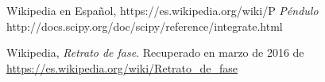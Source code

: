 \documentclass[12pt]{article}
\begin{document}
\pagebreak

\begin{thebibliography}{6}
	
	Wikipedia en Español, https://es.wikipedia.org/wiki/P%
	\emph{Péndulo}
	http://docs.scipy.org/doc/scipy/reference/integrate.html
	
	
	Wikipedia,
	\emph{Retrato de fase}. Recuperado en marzo de 2016 de \url{https://es.wikipedia.org/wiki/Retrato_de_fase}


\end{thebibliography}
\end{document}
